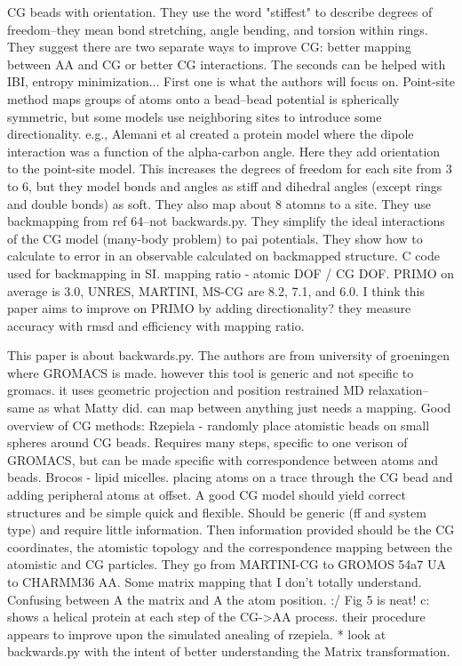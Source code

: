 \documentclass{article}
\begin{document}
\cite{Haxton2015a}
CG beads with orientation. They use the word "stiffest" to describe degrees of freedom--they mean bond stretching, angle bending, and torsion within rings. They suggest there are two separate ways to improve CG: better mapping between AA and CG or better CG interactions. The seconds can be helped with IBI, entropy minimization... First one is what the authors will focus on.
Point-site method maps groups of atoms onto a bead--bead potential is spherically symmetric, but some models use neighboring sites to introduce some directionality. e.g., Alemani et al created a protein model where the dipole interaction was a function of the alpha-carbon angle. Here they add orientation to the point-site model. This increases the degrees of freedom for each site from 3 to 6, but they model bonds and angles as stiff and dihedral angles (except rings and double bonds) as soft. They also map about 8 atomns to a site. They use backmapping from ref 64--not backwards.py. 
They simplify the ideal interactions of the CG model (many-body problem) to pai potentials. They show how to calculate to error in an observable calculated on backmapped structure. C code used for backmapping in SI.
mapping ratio - atomic DOF / CG DOF. PRIMO on average is 3.0, UNRES, MARTINI, MS-CG are 8.2, 7.1, and 6.0. I think this paper aims to improve on PRIMO by adding directionality? they measure accuracy with rmsd and efficiency with mapping ratio.

\cite{Wassenar2014b}

This paper is about backwards.py. The authors are from university of groeningen where GROMACS is made. however this tool is generic and not specific to gromacs. it uses geometric projection and position restrained MD relaxation--same as what Matty did. can map between anything just needs a mapping.
Good overview of CG methods:
Rzepiela - randomly place atomistic beads on small spheres around CG beads. Requires many steps, specific to one verison of GROMACS, but can be made specific with correspondence between atoms and beads.
Brocos - lipid micelles. placing atoms on a trace through the CG bead and adding peripheral atoms at offset. 
A good CG model should yield correct structures and be simple quick and flexible. Should be generic (ff and system type) and require little information. Then information provided should be the CG coordinates, the atomistic topology and the correspondence mapping between the atomistic and CG particles.
They go from MARTINI-CG to GROMOS 54a7 UA to CHARMM36 AA.
Some matrix mapping that I don't totally understand. Confusing between A the matrix and A the atom position. :/
Fig 5 is neat! c: shows a helical protein at each step of the CG->AA process. their procedure appears to improve upon the simulated anealing of rzepiela. 
* look at backwards.py with the intent of better understanding the Matrix transformation.
\end{document}

